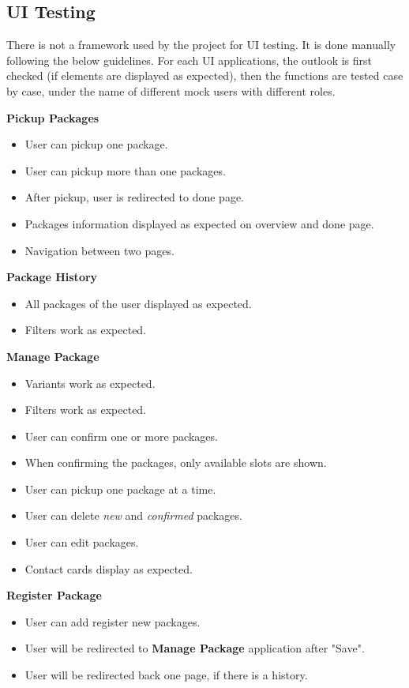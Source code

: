 \subsection{UI Testing}
\label{subsec:test-ui}

There is not a framework used by the project for UI testing. It is done manually following the below guidelines. For each UI applications, the outlook is first checked (if elements are displayed as expected), then the functions are tested case by case, under the name of different mock users with different roles. 

\noindent
\textbf{Pickup Packages}
\begin{itemize}
    \item User can pickup one package.
    \item User can pickup more than one packages.
    \item After pickup, user is redirected to done page.
    \item Packages information displayed as expected on overview and done page.
    \item Navigation between two pages.
\end{itemize}

\noindent
\textbf{Package History}
\begin{itemize}
    \item All packages of the user displayed as expected.
    \item Filters work as expected.
\end{itemize}

\noindent
\textbf{Manage Package}
\begin{itemize}
    \item Variants work as expected.
    \item Filters work as expected.
    \item User can confirm one or more packages.
    \item When confirming the packages, only available slots are shown.
    \item User can pickup one package at a time.
    \item User can delete \textit{new} and \textit{confirmed} packages.
    \item User can edit packages.
    \item Contact cards display as expected.
\end{itemize}

\noindent
\textbf{Register Package}
\begin{itemize}
    \item User can add register new packages.
    \item User will be redirected to \textbf{Manage Package} application after "Save".
    \item User will be redirected back one page, if there is a history.
\end{itemize}

